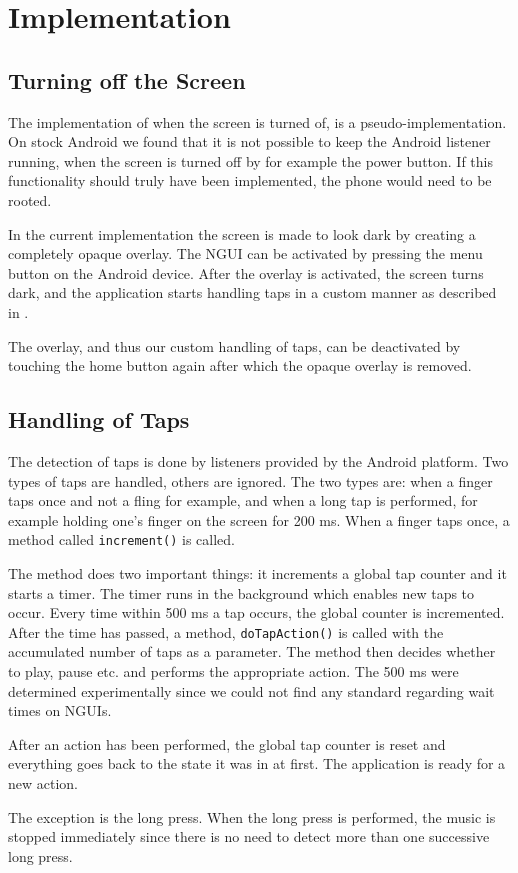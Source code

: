 \section{Implementation}
\subsection{Turning off the Screen}
The implementation of when the screen is turned of, is a pseudo-implementation. On stock Android we found that it is not possible to keep the Android listener running, when the screen is turned off by for example the power button. If this functionality should truly have been implemented, the phone would need to be rooted.

In the current implementation the screen is made to look dark by creating a completely opaque overlay. The NGUI can be activated by pressing the menu button on the Android device. After the overlay is activated, the screen turns dark, and the application starts handling taps in a custom manner as described in .

The overlay, and thus our custom handling of taps, can be deactivated by touching the home button again after which the opaque overlay is removed.

\subsection{Handling of Taps}\label{subsec:handleTaps}
The detection of taps is done by listeners provided by the Android platform. Two types of taps are handled, others are ignored. The two types are: when a finger taps once and not a fling for example, and when a long tap is performed, for example holding one's finger on the screen for 200 ms. When a finger taps once, a method called \texttt{increment()} is called.

The method does two important things: it increments a global tap counter and it starts a timer. The timer runs in the background which enables new taps to occur. Every time within 500 ms a tap occurs, the global counter is incremented. After the time has passed, a method, \texttt{doTapAction()} is called with the accumulated number of taps as a parameter. The method then decides whether to play, pause etc. and performs the appropriate action. The 500 ms were determined experimentally since we could not find any standard regarding wait times on NGUIs.

After an action has been performed, the global tap counter is reset and everything goes back to the state it was in at first. The application is ready for a new action.

The exception is the long press. When the long press is performed, the music is stopped immediately since there is no need to detect more than one successive long press.